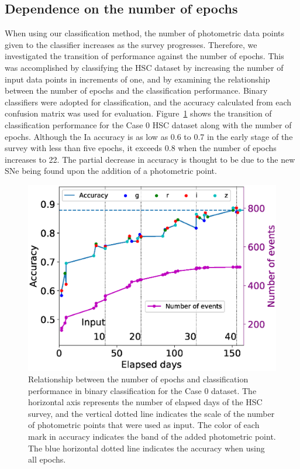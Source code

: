 \documentclass[useamsfonts]{pasj01}
\begin{document}
\subsection{Dependence on the number of epochs}
%
When using our classification method, the number of photometric data points given to the classifier increases as the survey progresses.
Therefore, we investigated the transition of performance against the number of epochs.
This was accomplished by classifying the HSC dataset by increasing the number of input data points in increments of one, and by examining the relationship between the number of epochs and the classification performance.
Binary classifiers were adopted for classification, and the accuracy calculated from each confusion matrix was used for evaluation.
Figure\ \ref{fig:n_observations} shows the transition of classification performance for the Case 0 HSC dataset along with the number of epochs.
Although the Ia accuracy is as low as 0.6 to 0.7 in the early stage of the survey with less than five epochs, it exceeds 0.8 when the number of epochs increases to 22.
The partial decrease in accuracy is thought to be due to the new SNe being found upon the addition of a photometric point.
%
\begin{figure}[htbp]
  \begin{center}
     \includegraphics[width=\columnwidth]{figures/n_observations_v2_case0.eps}
  \end{center}
  \caption{%
  Relationship between the number of epochs and classification performance in binary classification for the Case 0 dataset. 
  The horizontal axis represents the number of elapsed days of the HSC survey, and the vertical dotted line indicates the scale of the number of photometric points that were used as input. 
  The color of each mark in accuracy indicates the band of the added photometric point. 
  The blue horizontal dotted line indicates the accuracy when using all epochs.
  }%
  \label{fig:n_observations}
\end{figure}
%
\end{document}
